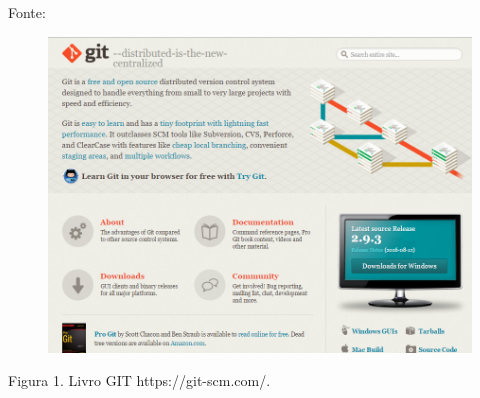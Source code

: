 \documentclass[t]{beamer}
\begin{document}
	
\begin{frame} {Fonte:}
		

\begin{figure}[tb!]
	\centering
	\includegraphics[scale=0.3,keepaspectratio=true]{site.png}
\end{figure}
Figura 1. Livro GIT https://git-scm.com/.	
\end{frame}			
\end{document}
